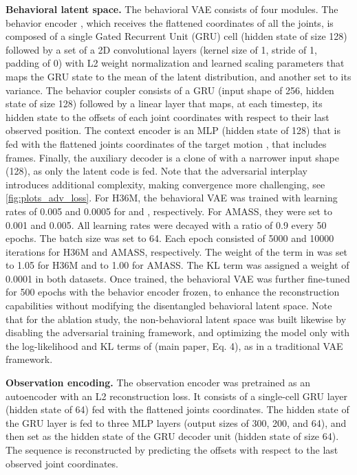 \documentclass[10pt,twocolumn,letterpaper]{article}
\begin{document}
\textbf{Behavioral latent space.}
The behavioral VAE consists of four modules. The behavior encoder , which receives the flattened coordinates of all the joints, is composed of a single Gated Recurrent Unit (GRU) cell (hidden state of size 128) followed by a set of a 2D convolutional layers (kernel size of 1, stride of 1, padding of 0) with L2 weight normalization and learned scaling parameters that maps the GRU state to the mean of the latent distribution, and another set to its variance. The behavior coupler  consists of a GRU (input shape of 256, hidden state of size 128) followed by a linear layer that maps, at each timestep, its hidden state to the offsets of each joint coordinates with respect to their last observed position. The context encoder  is an MLP (hidden state of 128) that is fed with the flattened joints coordinates of the target motion , that includes  frames. 
Finally, the auxiliary decoder  is a clone of  with a narrower input shape (128), as only the latent code is fed. Note that the adversarial interplay introduces additional complexity, making convergence more challenging, see \autoref{fig:plots_adv_loss}.
For H36M, the behavioral VAE was trained with learning rates of 0.005 and 0.0005 for  and , respectively. For AMASS, they were set to 0.001 and 0.005. All learning rates were decayed with a ratio of 0.9 every 50 epochs. The batch size was set to 64. Each epoch consisted of 5000 and 10000 iterations for H36M and AMASS, respectively. The weight of the  term in  was set to 1.05 for H36M and to 1.00 for AMASS. The KL term was assigned a weight of 0.0001 in both datasets.
Once trained, the behavioral VAE was further fine-tuned for 500 epochs with the behavior encoder  frozen, to enhance the reconstruction capabilities without modifying the disentangled behavioral latent space.
Note that for the ablation study, the non-behavioral latent space was built likewise by disabling the adversarial training framework, and optimizing the model only with the log-likelihood and KL terms of  (main paper, Eq. 4), as in a traditional VAE framework.

\textbf{Observation encoding. }The observation encoder  was pretrained as an autoencoder with an L2 reconstruction loss. It consists of a single-cell GRU layer (hidden state of 64) fed with the flattened joints coordinates. The hidden state of the GRU layer is fed to three MLP layers (output sizes of 300, 200, and 64), and then set as the hidden state of the GRU decoder unit (hidden state of size 64). The sequence is reconstructed by predicting the offsets with respect to the last observed joint coordinates.
\end{document}
